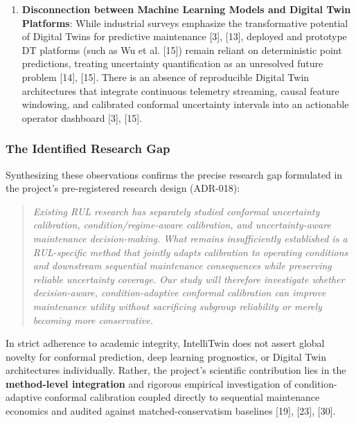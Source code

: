 \documentclass[12pt,a4paper]{article}
\begin{document}
\begin{enumerate}
    \item \textbf{Disconnection between Machine Learning Models and Digital Twin Platforms}: While industrial surveys emphasize the transformative potential of Digital Twins for predictive maintenance [3], [13], deployed and prototype DT platforms (such as Wu et al. [15]) remain reliant on deterministic point predictions, treating uncertainty quantification as an unresolved future problem [14], [15]. There is an absence of reproducible Digital Twin architectures that integrate continuous telemetry streaming, causal feature windowing, and calibrated conformal uncertainty intervals into an actionable operator dashboard [3], [15].
\end{enumerate}

\subsubsection*{The Identified Research Gap}
Synthesizing these observations confirms the precise research gap formulated in the project's pre-registered research design (ADR-018):
\begin{quote}
\textit{Existing RUL research has separately studied conformal uncertainty calibration, condition/regime-aware calibration, and uncertainty-aware maintenance decision-making. What remains insufficiently established is a RUL-specific method that jointly adapts calibration to operating conditions and downstream sequential maintenance consequences while preserving reliable uncertainty coverage. Our study will therefore investigate whether decision-aware, condition-adaptive conformal calibration can improve maintenance utility without sacrificing subgroup reliability or merely becoming more conservative.}
\end{quote}

In strict adherence to academic integrity, IntelliTwin does not assert global novelty for conformal prediction, deep learning prognostics, or Digital Twin architectures individually. Rather, the project's scientific contribution lies in the \textbf{method-level integration} and rigorous empirical investigation of condition-adaptive conformal calibration coupled directly to sequential maintenance economics and audited against matched-conservatism baselines [19], [23], [30].
\end{document}
